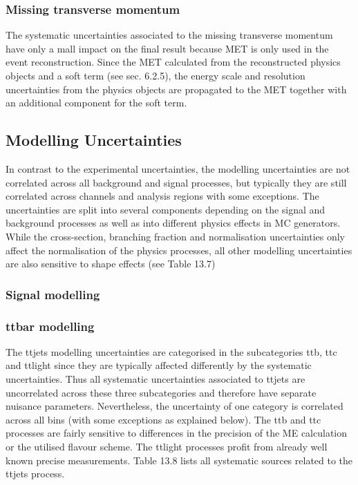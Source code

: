 \subsubsection{Missing transverse momentum}
The systematic uncertainties associated to the missing transverse momentum have only a mall impact on the final result because MET is only used in the event reconstruction. Since the MET calculated from the reconstructed physics objects and a soft term (see sec. 6.2.5), the energy scale and resolution uncertainties from the physics objects are propagated to the MET together with an additional component for the soft term. 

\subsection{Modelling Uncertainties}
In contrast to the experimental uncertainties, the modelling uncertainties are not correlated across all background and signal processes, but typically they are still correlated across channels and analysis regions with some exceptions. The uncertainties are split into several components depending on the signal and background processes as well as into different physics effects in MC generators. While the cross-section, branching fraction and normalisation uncertainties only affect the normalisation of the physics processes, all other modelling uncertainties are also sensitive to shape effects (see Table 13.7)


\subsubsection{Signal modelling}

\subsubsection{ttbar modelling}

The ttjets modelling uncertainties are categorised in the subcategories ttb, ttc and ttlight since they are typically affected differently by the systematic uncertainties. Thus all systematic uncertainties associated to ttjets are uncorrelated across these three subcategories and therefore have separate nuisance parameters. Nevertheless, the uncertainty of one category is correlated across all bins (with some exceptions as explained below). The ttb and ttc processes are fairly sensitive to differences in the precision of the ME calculation or the utilised flavour scheme. The ttlight processes profit from already well known precise measurements. Table 13.8 lists all systematic sources related to the ttjets process. 

